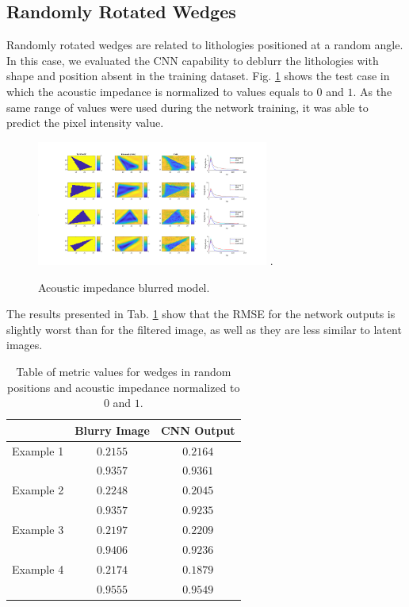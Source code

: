 \documentclass[conference,compsoc]{IEEEtran}
\begin{document}
\subsection{Randomly Rotated Wedges}
Randomly rotated wedges are related to lithologies positioned at a random angle.
In this case, we evaluated the CNN capability to deblurr the lithologies with shape and position absent
in the training dataset. Fig. \ref{fig_scenario4} shows the test case in which the acoustic impedance
is normalized to values equals to $0$ and $1$. As the same range of values were used during
the network training, it was able to predict the pixel intensity value.
\begin{figure}[!t]
\centering
\includegraphics[width=3.0in]{Figs/Caso4}
\DeclareGraphicsExtensions.
\caption{Acoustic impedance blurred model.}
\label{fig_scenario4}
\end{figure}

The results presented in Tab. \ref{table_caso_6} show that the RMSE for the network outputs
is slightly worst than for the filtered image, as well as they are less similar to latent
images. 
\begin{table}[!t]
\renewcommand{\arraystretch}{1.3}
\caption{Table of metric values for wedges in random positions and acoustic impedance normalized to $0$ and $1$.}
\label{table_caso_6}
\centering
\begin{tabular}{|c||c||c|}
\hline
 & Blurry Image & CNN Output \\
\hline
Example 1 & $0.2155$ & $0.2164$\\
\hline
	  & $0.9357$ & $0.9361$\\
\hline
Example 2 & $0.2248$ & $0.2045$ \\
\hline
	  & $0.9357$ & $0.9235$\\
\hline
Example 3 & $0.2197$ & $0.2209$\\
\hline
	  & $0.9406$ & $0.9236$\\
\hline
Example 4 & $0.2174$ & $0.1879$\\
\hline
	  & $0.9555$ & $0.9549$\\
\hline
\end{tabular}
\end{table}
\end{document}
